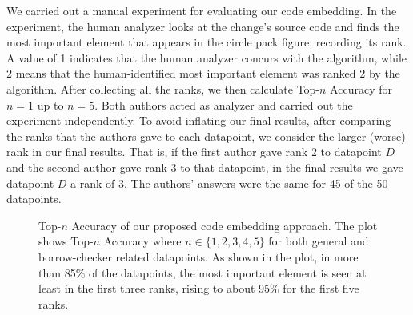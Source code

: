 We carried out a manual experiment for evaluating our code embedding. In the experiment, the human analyzer looks at the change's source code and finds the most important element that appears in the circle pack figure, recording its rank. A value of 1 indicates that the human analyzer concurs with the algorithm, while 2 means that the human-identified most important element was ranked 2 by the algorithm. After collecting all the ranks, we then calculate Top-$n$ Accuracy for $n=1$ up to $n=5$. Both authors acted as analyzer and carried out the experiment independently. To avoid inflating our final results, after comparing the ranks that the authors gave to each datapoint, we consider the larger (worse) rank in our final results. That is, if the first author gave rank 2 to datapoint $D$ and the second author gave rank 3 to that datapoint, in the final results we gave datapoint $D$ a rank of 3. The authors' answers were the same for 45 of the 50 datapoints.

\begin{figure}[h]
\centering

\caption{\label{fig:rq1} Top-$n$ Accuracy of our proposed code embedding approach. The plot shows Top-$n$ Accuracy where $n\in\{1,2,3,4,5\}$ for both general and borrow-checker related datapoints. As shown in the plot, in more than 85\% of the datapoints, the most important element is seen at least in the first three ranks, rising to about 95\% for the first five ranks.}

\end{figure}

